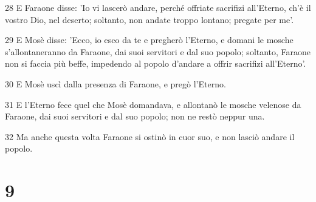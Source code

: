 \par 28 E Faraone disse: 'Io vi lascerò andare, perché offriate sacrifizi all'Eterno, ch'è il vostro Dio, nel deserto; soltanto, non andate troppo lontano; pregate per me'.
\par 29 E Mosè disse: 'Ecco, io esco da te e pregherò l'Eterno, e domani le mosche s'allontaneranno da Faraone, dai suoi servitori e dal suo popolo; soltanto, Faraone non si faccia più beffe, impedendo al popolo d'andare a offrir sacrifizi all'Eterno'.
\par 30 E Mosè uscì dalla presenza di Faraone, e pregò l'Eterno.
\par 31 E l'Eterno fece quel che Mosè domandava, e allontanò le mosche velenose da Faraone, dai suoi servitori e dal suo popolo; non ne restò neppur una.
\par 32 Ma anche questa volta Faraone si ostinò in cuor suo, e non lasciò andare il popolo.

\chapter{9}

